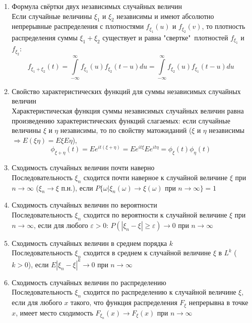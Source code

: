 \documentclass[a4paper, 12pt]{article}
\begin{document}
\begin{enumerate}
    \item Формула свёртки двух независимых случайных величин\\
    Если случайные величины $\xi_1$ и $\xi_2$ независимы и имеют абсолютно непрерывные распределения с плотностями $f_{\xi_1}(u)$ и $f_{\xi_2}(v)$, то плотность распределения суммы $\xi_1+\xi_2$ существует и равна "свертке"\ плотностей $f_{\xi_1}$ и $f_{\xi_2}$:
    \[ f_{\xi_1+\xi_2}(t)=\int\limits_{-\infty}^{\infty}f_{\xi_1}(u)f_{\xi_2}(t-u)du=\int\limits_{-\infty}^{\infty}f_{\xi_2}(u)f_{\xi_1}(t-u)du\]
    
    \item Свойство характеристических функций для суммы независимых случайных величин\\
    Характеристическая функция суммы независимых случайных величин равна произведению характеристических функций слагаемых: если случайные величины $\xi$ и $\eta$ независимы, то по свойству матожиданий ($\xi$ и $\eta$ независимы $\Rightarrow E(\xi\eta)=E\xi E\eta$),
    \[ \phi_{\xi+\eta}(t)=Ee^{it(\xi+\eta)}=Ee^{it\xi}Ee^{it\eta}=\phi_\xi(t)\phi_\eta(t)\]
    
    \item Сходимость случайных величин почти наверно\\
    Последовательность ${\xi_n}$ сходится почти наверное к случайной величине $\xi$ при $n\rightarrow\infty$ ($\xi_n\rightarrow\xi$ п.н.), если $P\{\omega|\xi_n(\omega)\rightarrow\xi(\omega)$ при $n\rightarrow\infty\}=1$
    
    \item Сходимость случайных величин по вероятности\\
    Последовательность ${\xi_n}$ сходится по вероятности к случайной величине $\xi$ при $n\rightarrow\infty$, если для любого $\varepsilon>0$: $P(|\xi_n-\xi|\geq\varepsilon)\rightarrow0$ при $n\rightarrow\infty$
    
    \item Сходимость случайных величин в среднем порядка $k$\\
    Последовательность ${\xi_n}$ сходится в среднем к случайной величине $\xi$ в $L^k$ ($k>0$), если $E|\xi_n-\xi|^k\rightarrow0$ при $n\rightarrow\infty$
    
    \item Сходимость случайных величин по распределению\\
    Последовательность ${\xi_n}$ сходится по распределению к случайной величине $\xi$, если для любого $x$ такого, что функция распределения $F_\xi$ непрерывна в точке $x$, имеет место сходимость $F_{\xi_n}(x)\rightarrow F_\xi(x)$ при $n\rightarrow\infty$ 
    

\end{enumerate}
\end{document}
